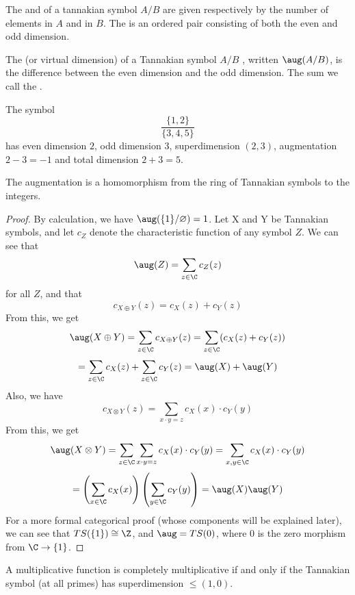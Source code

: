 \documentclass[a4paper]{article}
\begin{document}
\begin{definition}
The  and  of a tannakian symbol $A/B$ are given respectively by the number of elements in $A$ and in $B$. The  is an ordered pair consisting of both the even and odd dimension.
\end{definition}%

\begin{definition}
The  (or virtual dimension) of a Tannakian symbol $A/B$ , written $\aug(A/B)$, is the difference between the even dimension and the odd dimension. The sum we call the .
\end{definition}

\begin{example}
The symbol $$\frac{\{1,2\}}{\{3,4,5\}}$$ has even dimension $2$, odd dimension $3$, superdimension $(2, 3)$, augmentation $2 - 3 = -1$ and total dimension $2 + 3 = 5$.
\end{example}

\begin{proposition}
The augmentation is a homomorphism from the ring of Tannakian symbols to the integers.
\end{proposition}

\begin{proof}
By calculation, we have $\aug(\{1\}/\varnothing) = 1$. Let X and Y be Tannakian symbols, and let $c_Z$ denote the characteristic function of any symbol $Z$. We can see that 
$$\aug(Z) = \sum_{z \in \C} c_Z(z)$$
for all $Z$, and that 
$$c_{X \oplus Y}(z) = c_X(z) + c_Y(z)$$
From this, we get
$$\aug(X \oplus Y) = \sum_{z \in \C} c_{X \oplus Y}(z) = \sum_{z \in \C} (c_X(z) + c_Y(z)) $$
$$ = \sum_{z \in \C} c_X(z) + \sum_{z \in \C} c_Y(z) = \aug(X) + \aug(Y)$$
Also, we have 
$$c_{X \otimes Y}(z) = \sum_{x \cdot y=z} c_X(x) \cdot c_Y(y)$$
From this, we get
$$\aug(X \otimes Y) = \sum_{z \in \C} \sum_{x \cdot y=z}c_X(x) \cdot c_Y(y) = \sum_{x, y \in \C} c_X(x) \cdot c_Y(y) $$
$$=\left(\sum_{x \in \C} c_X(x)\right)\left(\sum_{y \in \C} c_Y(y)\right) = \aug(X)\aug(Y)$$
For a more formal categorical proof (whose components will be explained later), we can see that $TS(\{1\}) \cong \Z$, and $\aug = TS(0)$, where $0$ is the zero morphism from $\C \to \{1\}$.
\end{proof}

\begin{proposition}\label{compmultstructure}
A multiplicative function is completely multiplicative if and only if the Tannakian symbol (at all primes) has superdimension $\le (1, 0)$.
\end{proposition}
\end{document}
